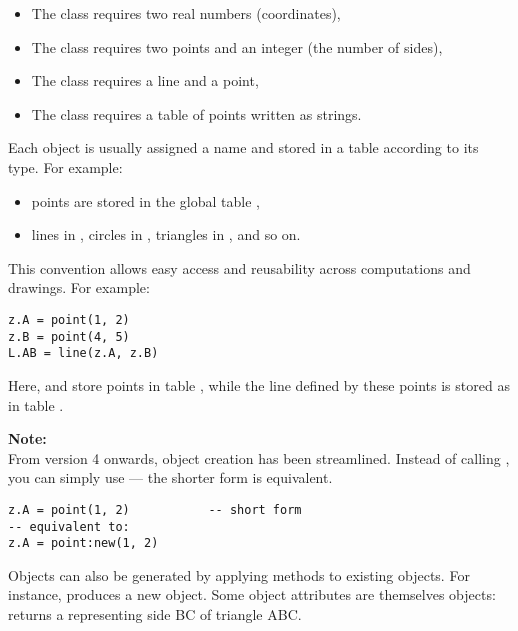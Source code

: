 \begin{itemize}
  \item The  class requires two real numbers (coordinates),
  \item The  class requires two points and an integer (the number of sides),
  \item The  class requires a line and a point,
  \item The  class requires a table of points written as strings.
\end{itemize}

Each object is usually assigned a name and stored in a table according to its type. For example:
\begin{itemize}
  \item points are stored in the global table ,
  \item lines in , circles in , triangles in , and so on.
\end{itemize}

This convention allows easy access and reusability across computations and drawings. For example:

\begin{mybox}
\begin{verbatim}
z.A = point(1, 2)
z.B = point(4, 5)
L.AB = line(z.A, z.B)
\end{verbatim}
\end{mybox}

\noindent
Here,  and  store points in table , while the line defined by these points is stored as  in table .

\vspace{1em}
\tkzRHand{} \textbf{Note:} \\
From version 4 onwards, object creation has been streamlined. Instead of calling , you can simply use  — the shorter form is equivalent.

\begin{mybox}
\begin{verbatim}
z.A = point(1, 2)           -- short form
-- equivalent to:
z.A = point:new(1, 2)
\end{verbatim}
\end{mybox}

Objects can also be generated by applying methods to existing objects. For instance,  produces a new  object. Some object attributes are themselves objects:  returns a  representing side BC of triangle ABC.

